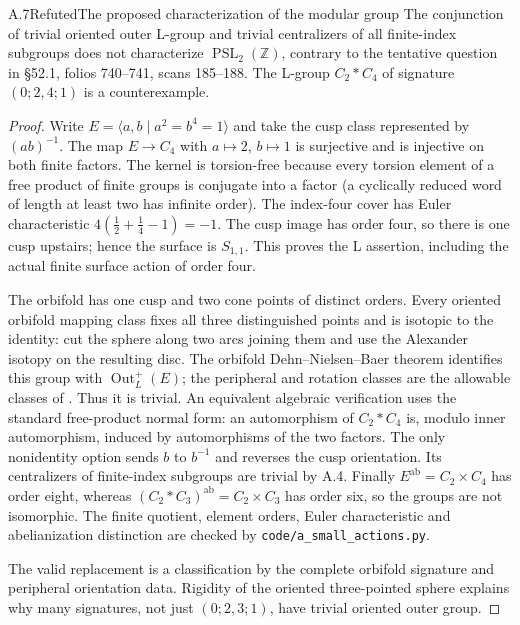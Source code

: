 \begin{statement}{A.7}{Refuted}{The proposed characterization of the modular group}
The conjunction of trivial oriented outer L-group and trivial
centralizers of all finite-index subgroups does not characterize
$\operatorname{PSL}_2(\mathbb Z)$, contrary to the tentative
question in \S52.1, folios 740--741, scans 185--188.
The L-group $C_2*C_4$ of signature $(0;2,4;1)$ is a counterexample.
\end{statement}
\begin{proof}
Write $E=\langle a,b\mid a^2=b^4=1\rangle$ and take the cusp
class represented by $(ab)^{-1}$. The map $E\to C_4$ with
$a\mapsto2$, $b\mapsto1$ is surjective and is injective on both
finite factors. The kernel is torsion-free because every torsion
element of a free product of finite groups is conjugate into a
factor (a cyclically reduced word of length at least two has
infinite order). The index-four cover has Euler characteristic
$4(\tfrac12+\tfrac14-1)=-1$. The cusp image has order four, so
there is one cusp upstairs; hence the surface is $S_{1,1}$.
This proves the L assertion, including the actual finite surface
action of order four.

The orbifold has one cusp and two cone points of distinct orders.
Every oriented orbifold mapping class fixes all three distinguished
points and is isotopic to the identity: cut the sphere along two
arcs joining them and use the Alexander isotopy on the resulting
disc. The orbifold Dehn--Nielsen--Baer theorem identifies this
group with $\operatorname{Out}_L^+(E)$; the peripheral and rotation
classes are the allowable classes of
\citet[\S4, pp.~255--256]{Kerckhoff1983}. Thus it is trivial.
An equivalent algebraic verification uses the standard free-product
normal form: an automorphism of $C_2*C_4$ is, modulo inner
automorphism, induced by automorphisms of the two factors. The
only nonidentity option sends $b$ to $b^{-1}$ and reverses the
cusp orientation. Its centralizers of finite-index subgroups
are trivial by A.4. Finally
$E^{\mathrm{ab}}=C_2\times C_4$ has order eight, whereas
$(C_2*C_3)^{\mathrm{ab}}=C_2\times C_3$ has order six, so the
groups are not isomorphic. The finite quotient, element orders,
Euler characteristic and abelianization distinction are checked
by \texttt{code/a\_small\_actions.py}.

The valid replacement is a classification by the complete orbifold
signature and peripheral orientation data. Rigidity of the
oriented three-pointed sphere explains why many signatures, not
just $(0;2,3;1)$, have trivial oriented outer group.
\end{proof}

